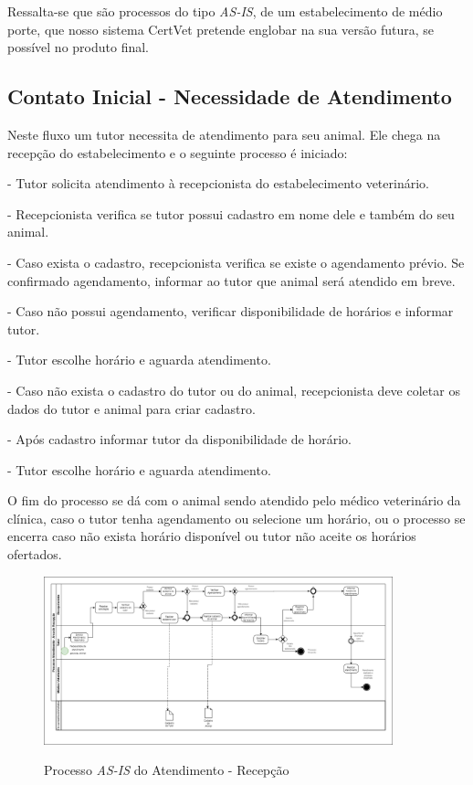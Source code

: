 \documentclass[
    12pt,               %
    openright,          %
    oneside,
    a4paper,            %
    BIBLATEX,           %
    TODO,               %
    english,            %
    brazil              %
    ]{ifsp-spo-inf-ctds}
\begin{document}
    Ressalta-se que são processos do tipo \emph{AS-IS}, de um estabelecimento de médio porte, que nosso sistema CertVet pretende englobar na sua versão futura, se possível no produto final.

    \subsection{Contato Inicial - Necessidade de Atendimento}

     Neste fluxo um tutor necessita de atendimento para seu animal. Ele chega na recepção do estabelecimento e o seguinte processo é iniciado:

      - Tutor solicita atendimento à recepcionista do estabelecimento veterinário.

      - Recepcionista verifica se tutor possui cadastro em nome dele e também do seu animal.

      - Caso exista o cadastro, recepcionista verifica se existe o agendamento prévio. Se confirmado agendamento, informar ao tutor que animal será atendido em breve.

      - Caso não possui agendamento, verificar disponibilidade de horários e informar tutor.

      - Tutor escolhe horário e aguarda atendimento.

      - Caso não exista o cadastro do tutor ou do animal, recepcionista deve coletar os dados do tutor e animal para criar cadastro.

      - Após cadastro informar tutor da disponibilidade de horário.

      - Tutor escolhe horário e aguarda atendimento.


    O fim do processo se dá com o animal sendo atendido pelo médico veterinário da clínica, caso o tutor tenha agendamento ou selecione um horário, ou o processo se encerra caso não exista horário disponível ou tutor não aceite os horários ofertados.



    \begin{figure}
        \centering
         \caption{Processo \emph{AS-IS} do Atendimento - Recepção}
        \includegraphics[width=0.9\textwidth]{images/fluxo de atendimento-rec.png}
        \label{fluxo-rec}
    \end{figure}  
\end{document}
